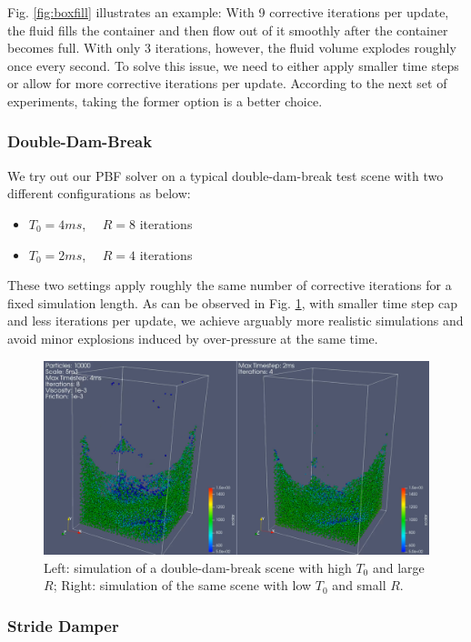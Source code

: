 \documentclass[
	11pt, 
	DIV10,
	ngerman,
	a4paper, 
	oneside, 
	headings=normal, 
	captions=tableheading,
	final, 
	numbers=noenddot
]{scrartcl}
\begin{document}
Fig. \ref{fig:boxfill} illustrates an example: With 9 corrective iterations per update, the fluid fills the container and then flow out of it smoothly after the container becomes full. With only 3 iterations, however, the fluid volume explodes roughly once every second. To solve this issue, we need to either apply smaller time steps or allow for more corrective iterations per update. According to the next set of experiments, taking the former option is a better choice.

\subsubsection{Double-Dam-Break}

We try out our PBF solver on a typical double-dam-break test scene with two different configurations as below:

\begin{itemize}
    \item $ T_{0} = 4ms $, $ \quad R = 8 $ iterations
    \item $ T_{0} = 2ms $, $ \quad R = 4 $ iterations
\end{itemize}

These two settings apply roughly the same number of corrective iterations for a fixed simulation length. As can be observed in Fig. \ref{fig:doubleDam}, with smaller time step cap and less iterations per update, we achieve arguably more realistic simulations and avoid minor explosions induced by over-pressure at the same time.

\begin{figure}[h]
    \centering
    \includegraphics[width=.6\textwidth]{pics/pbf_iter_ts.png}
    \caption{Left: simulation of a double-dam-break scene with high $ T_{0} $ and large $ R $; Right: simulation of the same scene with low $ T_{0} $ and small $ R $.}
    \label{fig:doubleDam}
\end{figure}

\subsubsection{Stride Damper}
\end{document}
